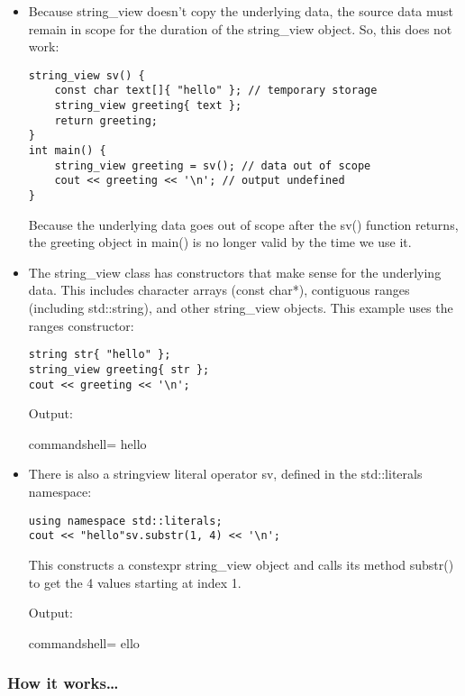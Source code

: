 \begin{itemize}
\item 
Because string\_view doesn't copy the underlying data, the source data must remain in scope for the duration of the string\_view object. So, this does not work:

\begin{lstlisting}[style=styleCXX]
string_view sv() {
	const char text[]{ "hello" }; // temporary storage
	string_view greeting{ text };
	return greeting;
}
int main() {
	string_view greeting = sv(); // data out of scope
	cout << greeting << '\n'; // output undefined
}
\end{lstlisting}

Because the underlying data goes out of scope after the sv() function returns, the greeting object in main() is no longer valid by the time we use it.

\item 
The string\_view class has constructors that make sense for the underlying data. This includes character arrays (const char*), contiguous ranges (including std::string), and other string\_view objects. This example uses the ranges constructor:

\begin{lstlisting}[style=styleCXX]
string str{ "hello" };
string_view greeting{ str };
cout << greeting << '\n';
\end{lstlisting}

Output:

\begin{tcblisting}{commandshell={}}
hello
\end{tcblisting}

\item 
There is also a stringview literal operator sv, defined in the std::literals namespace:

\begin{lstlisting}[style=styleCXX]
using namespace std::literals;
cout << "hello"sv.substr(1, 4) << '\n';
\end{lstlisting}

This constructs a constexpr string\_view object and calls its method substr() to get the 4 values starting at index 1.

Output:

\begin{tcblisting}{commandshell={}}
ello
\end{tcblisting}
\end{itemize}

\subsubsection{How it works…}

